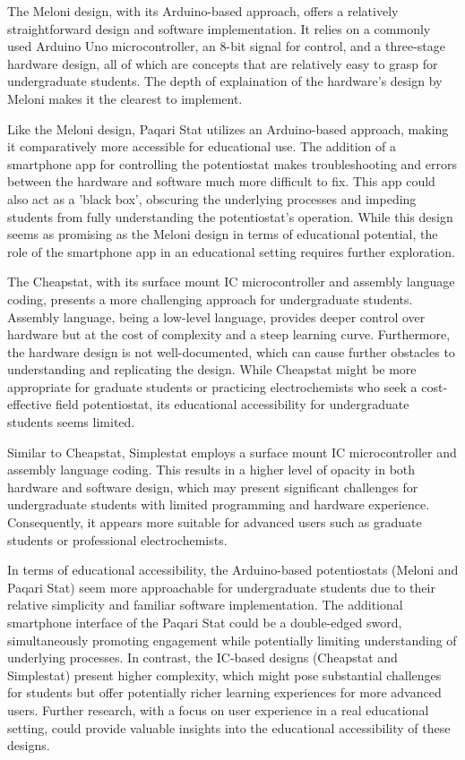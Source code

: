 \documentclass{article}
\begin{document}
The Meloni design, with its Arduino-based approach, offers a relatively straightforward design and software implementation. It relies on a commonly used Arduino Uno microcontroller, an 8-bit signal for control, and a three-stage hardware design, all of which are concepts that are relatively easy to grasp for undergraduate students. The depth of explaination of the hardware's design by Meloni makes it the clearest to implement.

Like the Meloni design, Paqari Stat utilizes an Arduino-based approach, making it comparatively more accessible for educational use. The addition of a smartphone app for controlling the potentiostat makes troubleshooting and errors between the hardware and software much more difficult to fix. This app could also act as a 'black box', obscuring the underlying processes and impeding students from fully understanding the potentiostat's operation. While this design seems as promising as the Meloni design in terms of educational potential, the role of the smartphone app in an educational setting requires further exploration.

The Cheapstat, with its surface mount IC microcontroller and assembly language coding, presents a more challenging approach for undergraduate students. Assembly language, being a low-level language, provides deeper control over hardware but at the cost of complexity and a steep learning curve. Furthermore, the hardware design is not well-documented, which can cause further obstacles to understanding and replicating the design. While Cheapstat might be more appropriate for graduate students or practicing electrochemists who seek a cost-effective field potentiostat, its educational accessibility for undergraduate students seems limited.

Similar to Cheapstat, Simplestat employs a surface mount IC microcontroller and assembly language coding. This results in a higher level of opacity in both hardware and software design, which may present significant challenges for undergraduate students with limited programming and hardware experience. Consequently, it appears more suitable for advanced users such as graduate students or professional electrochemists.

In terms of educational accessibility, the Arduino-based potentiostats (Meloni and Paqari Stat) seem more approachable for undergraduate students due to their relative simplicity and familiar software implementation. The additional smartphone interface of the Paqari Stat could be a double-edged sword, simultaneously promoting engagement while potentially limiting understanding of underlying processes. In contrast, the IC-based designs (Cheapstat and Simplestat) present higher complexity, which might pose substantial challenges for students but offer potentially richer learning experiences for more advanced users. Further research, with a focus on user experience in a real educational setting, could provide valuable insights into the educational accessibility of these designs.
\end{document}
